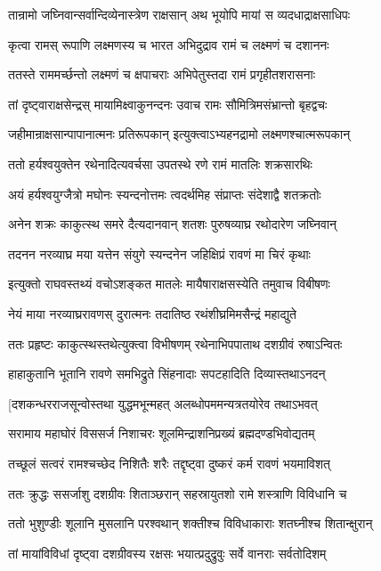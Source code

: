 \twolineshloka
{तान्रामो जघ्निवान्सर्वान्दिव्येनास्त्रेण राक्षसान्}
{अथ भूयोपि मायां स व्यदधाद्राक्षसाधिपः}


\twolineshloka
{कृत्वा रामस् रूपाणि लक्ष्मणस्य च भारत}
{अभिदुद्राव रामं च लक्ष्मणं च दशाननः}


\twolineshloka
{ततस्ते राममर्च्छन्तो लक्ष्मणं च क्षपाचराः}
{अभिपेतुस्तदा रामं प्रगृहीतशरासनाः}


\twolineshloka
{तां दृष्ट्वाराक्षसेन्द्रस् मायामिक्ष्वाकुनन्दनः}
{उवाच रामः सौमित्रिमसंभ्रान्तो बृहद्वचः}


\twolineshloka
{जहीमान्राक्षसान्पापानात्मनः प्रतिरूपकान्}
{इत्युक्त्वाऽभ्यहनद्रामो लक्ष्मणश्चात्मरूपकान्}


\twolineshloka
{ततो हर्यश्वयुक्तेन रथेनादित्यवर्चसा}
{उपतस्थे रणे रामं मातलिः शक्रसारथिः}



\twolineshloka
{अयं हर्यश्वयुग्जैत्रो मघोनः स्यन्दनोत्तमः}
{त्वदर्थमिह संप्राप्तः संदेशाद्वै शतक्रतोः}


\twolineshloka
{अनेन शक्रः काकुत्स्थ समरे दैत्यदानवान्}
{शतशः पुरुषव्याघ्र रथोदारेण जघ्निवान्}


\twolineshloka
{तदनन नरव्याघ्र मया यत्तेन संयुगे}
{स्यन्दनेन जहिक्षिप्रं रावणं मा चिरं कृथाः}


\twolineshloka
{इत्युक्तो राघवस्तथ्यं वचोऽशङ्कत मातलेः}
{मायैषाराक्षसस्येति तमुवाच विबीषणः}


\twolineshloka
{नेयं माया नरव्याघ्ररावणस् दुरात्मनः}
{तदातिष्ठ रथंशीघ्रमिमसैन्द्रं महाद्युते}


\twolineshloka
{ततः प्रहृष्टः काकुत्स्थस्तथेत्युक्त्वा विभीषणम्}
{रथेनाभिपपाताथ दशग्रीवं रुषाऽन्वितः}


\twolineshloka
{हाहाकुतानि भूतानि रावणे समभिद्रुते}
{सिंहनादाः सपटहादिति दिव्यास्तथाऽनदन्}


\twolineshloka
{[दशकन्धरराजसून्वोस्तथा युद्धमभून्महत्}
{अलब्धोपममन्यत्रतयोरेव तथाऽभवत्}


\twolineshloka
{सरामाय महाघोरं विससर्ज निशाचरः}
{शूलमिन्द्राशनिप्रख्यं ब्रह्मदण्डभिवोद्यतम्}


\twolineshloka
{तच्छूलं सत्वरं रामश्चच्छेद निशितैः शरैः}
{तद्दृष्ट्वा दुष्करं कर्म रावणं भयमाविशत्}


\twolineshloka
{ततः क्रुद्धः ससर्जाशु दशग्रीवः शिताञ्छरान्}
{सहस्रायुतशो रामे शस्त्राणि विविधानि च}


\twolineshloka
{ततो भुशुण्डीः शूलानि मुसलानि परश्वथान्}
{शक्तीश्च विविधाकाराः शतघ्नीश्च शितान्क्षुरान्}


\twolineshloka
{तां मायांविविधां दृष्ट्वा दशग्रीवस्य रक्षसः}
{भयात्प्रदुद्रुवुः सर्वे वानराः सर्वतोदिशम्}


